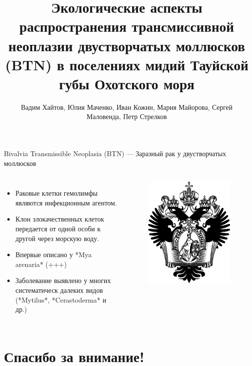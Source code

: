 \documentclass[
  ignorenonframetext,
]{beamer}
\title{Экологические аспекты распространения трансмиссивной неоплазии
двустворчатых моллюсков (BTN) в поселениях мидий Тауйской губы Охотского
моря}
\author{Вадим Хайтов, Юлия Маченко, Иван Кожин, Мария Майорова, Сергей
Маловенда, Петр Стрелков}
\date{}
\newcommand{\columnsbegin}{\begin{columns}}
\newcommand{\columnsend}{\end{columns}}
\begin{document}
\frame{\titlepage}

\begin{frame}{Bivalvia Transmissible Neoplasia (BTN) --- Заразный рак у
двустворчатых моллюсков}
\label{bivalvia-transmissible-neoplasia-btn-ux437ux430ux440ux430ux437ux43dux44bux439-ux440ux430ux43a-ux443-ux434ux432ux443ux441ux442ux432ux43eux440ux447ux430ux442ux44bux445-ux43cux43eux43bux43bux44eux441ux43aux43eux432}
\columnsbegin
     \begin{itemize}
        \item Раковые клетки гемолимфы являются инфекционным агентом.
        \item Клон злокачественных клеток передается от одной особи к другой через морскую воду.
        \item  Впервые описано у *Mya arenaria* (+++)
        \item Заболевание выявлено у многих систематическ далеких видов (*Mytilus*, *Cerastoderma* и др.)
     \end{itemize}


\begin{figure}
      \includegraphics[width=\textwidth,height=0.7\textheight,keepaspectratio]{./figure/Place_holder.png}

  \end{figure}

\columnsend
\end{frame}

\section{Спасибо за
внимание!}\label{ux441ux43fux430ux441ux438ux431ux43e-ux437ux430-ux432ux43dux438ux43cux430ux43dux438ux435}
\end{document}
